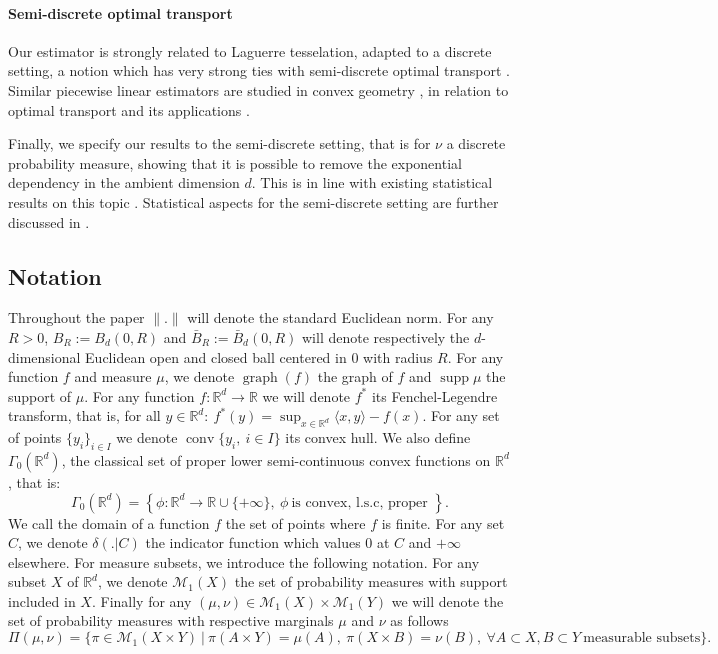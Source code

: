\documentclass[11pt]{article}
\DeclareMathOperator{\supp}{supp}
\DeclareMathOperator{\graph}{graph}
\DeclareMathOperator{\conv}{conv}
\newcommand{\R}{\mathbb R}
\newcommand{\1}{\mathbbm{1}}
\numberwithin{equation}{section}
\begin{document}
\paragraph{Semi-discrete optimal transport} Our estimator is strongly related to Laguerre tesselation, adapted to a discrete setting, a notion which has very strong ties with semi-discrete optimal transport \cite{aurenhammer1987power}. Similar piecewise linear estimators are studied in convex geometry \cite{gu2013variational}, in relation to optimal transport and its applications \cite{lei2019geometric}.

Finally, we specify our results to the semi-discrete setting, that is for $\nu$ a discrete probability measure, showing that it is possible to remove the exponential dependency in the ambient dimension $d$. This is in line with existing statistical results on this topic \cite{pooladian2023minimax,sadhu2024stability}. Statistical aspects for the semi-discrete setting are further discussed in .







\subsection{Notation}
Throughout the paper $\|.\|$ will denote the standard Euclidean norm. For any $R>0$, $B_R:=B_d(0,R)$ and $\bar{B}_R:=\bar{B}_d(0,R)$ will denote respectively the $d$-dimensional Euclidean open and closed ball centered in $0$ with radius $R$. For any function $f$ and measure $\mu$, we denote $\graph(f)$ the graph of $f$ and $\supp \mu$ the support of $\mu.$ 
For any function $f:\R^d\rightarrow\R$ we will denote $f^*$ its Fenchel-Legendre transform, that is, for all $y\in\R^d:\:f^*(y)=\sup_{x\in\R^d}\langle x,y \rangle-f(x)$. For any set of points $\{y_i\}_{i\in I}$ we denote $\conv\{y_i,\:i\in I\}$ its convex hull.
We also define $\Gamma_0(\R^d)$, the classical set of proper lower semi-continuous convex functions on $\R^d$, that is:
\begin{equation*}
\Gamma_0(\R^d)=\left\{ \phi:\R^d\longrightarrow\R\cup \{+\infty \},\:\phi\: \text{is convex, l.s.c, proper } \right\}.
\end{equation*}
We call the domain of a function $f$ the set of points where $f$ is finite. For any set $C$, we denote $\delta(.|C)$ the indicator function which values $0$ at $C$ and $+\infty$ elsewhere.
For measure subsets, we introduce the following notation. For any subset $X$ of $\R^d$, we denote $\mathcal{M}_1(X)$ the set of probability measures with support included in $X$. Finally for any $(\mu,\nu)\in\mathcal{M}_1(X)\times\mathcal{M}_1(Y)$ we will denote the set of probability measures with respective marginals $\mu$ and $\nu$ as follows
\begin{equation*}
\Pi(\mu,\nu)=\big\{\pi\in\mathcal{M}_1(X\times Y)\:|\:\pi(A\times Y)=\mu(A),\:\pi(X\times B)=\nu(B),\:\forall A\subset X,B\subset Y\:\text{measurable subsets}\big\}.
\end{equation*}
\end{document}
